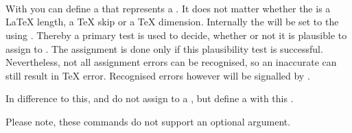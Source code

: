 \begin{Declaration}
  \\
  \\
  \\
\end{Declaration}
%
%
%
%
With  you can
define a  that represents a . It does not matter
whether the  is a \LaTeX{} length, a \TeX{} skip or a \TeX{}
dimension. Internally the  will be set to the 
using . Thereby a primary test is used to decide,
whether or not it is plausible to assign  to . The
assignment is done only if this plausibility test is successful. Nevertheless,
not all assignment errors can be recognised, so an inaccurate 
can still result in \TeX{} error. Recognised errors however will be signalled
by .

In difference to this,  and
 do not assign  to a ,
but define a  with this .

Please note, these commands do not support an optional
 argument.%
%
%
%
%

